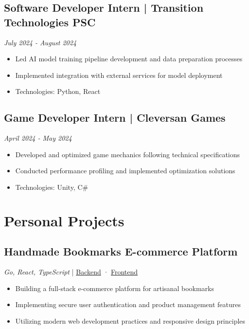 \documentclass[a4paper,10pt]{article}
\begin{document}
\subsection{Software Developer Intern | Transition Technologies PSC}
\textit{July 2024 - August 2024}
\begin{itemize}[leftmargin=0.5cm, nosep]
    \item Led AI model training pipeline development and data preparation processes
    \item Implemented integration with external services for model deployment
    \item Technologies: Python, React
\end{itemize}

\subsection{Game Developer Intern | Cleversan Games}
\textit{April 2024 - May 2024}
\begin{itemize}[leftmargin=0.5cm, nosep]
    \item Developed and optimized game mechanics following technical specifications
    \item Conducted performance profiling and implemented optimization solutions
    \item Technologies: Unity, C\#
\end{itemize}

\section{Personal Projects}

\subsection{Handmade Bookmarks E-commerce Platform}
\textit{Go, React, TypeScript} | \href{https://github.com/ZDSDD/zakladki}{Backend} · \href{https://github.com/ZDSDD/zakladki-front}{Frontend}
\begin{itemize}[leftmargin=0.5cm, nosep]
    \item Building a full-stack e-commerce platform for artisanal bookmarks
    \item Implementing secure user authentication and product management features
    \item Utilizing modern web development practices and responsive design principles
\end{itemize}
\end{document}
